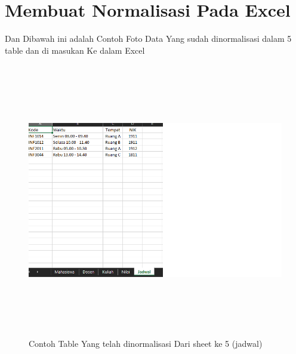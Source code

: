 \documentclass[a4, 13pt]{article}
\begin{document}
    \section{Membuat Normalisasi Pada Excel}
    Dan Dibawah ini adalah Contoh Foto Data Yang sudah dinormalisasi dalam 5 table dan di masukan Ke dalam Excel
    \begin{figure}[!htbp]
        \centering
        \includegraphics[width=16cm, height=12cm]{pictures/2.png}
        \caption{Contoh Table Yang telah dinormalisasi Dari sheet ke 5 (jadwal)}
        \label{fig:my_label}
    \end{figure}
    \vspace{2cm}
    
\end{document}
